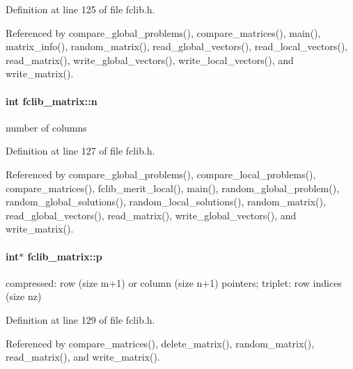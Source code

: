 Definition at line 125 of file fclib.\+h.



Referenced by compare\+\_\+global\+\_\+problems(), compare\+\_\+matrices(), main(), matrix\+\_\+info(), random\+\_\+matrix(), read\+\_\+global\+\_\+vectors(), read\+\_\+local\+\_\+vectors(), read\+\_\+matrix(), write\+\_\+global\+\_\+vectors(), write\+\_\+local\+\_\+vectors(), and write\+\_\+matrix().

\hypertarget{structfclib__matrix_ace0c395ca5da8a4bcc4958a29895c639}{}
\paragraph[{n}]{\setlength{\rightskip}{0pt plus 5cm}int fclib\+\_\+matrix\+::n}\label{structfclib__matrix_ace0c395ca5da8a4bcc4958a29895c639}


number of columns 



Definition at line 127 of file fclib.\+h.



Referenced by compare\+\_\+global\+\_\+problems(), compare\+\_\+local\+\_\+problems(), compare\+\_\+matrices(), fclib\+\_\+merit\+\_\+local(), main(), random\+\_\+global\+\_\+problem(), random\+\_\+global\+\_\+solutions(), random\+\_\+local\+\_\+solutions(), random\+\_\+matrix(), read\+\_\+global\+\_\+vectors(), read\+\_\+matrix(), write\+\_\+global\+\_\+vectors(), and write\+\_\+matrix().

\hypertarget{structfclib__matrix_ace167d937e3c1bb2558e264aefada841}{}
\paragraph[{p}]{\setlength{\rightskip}{0pt plus 5cm}int$\ast$ fclib\+\_\+matrix\+::p}\label{structfclib__matrix_ace167d937e3c1bb2558e264aefada841}


compressed\+: row (size m+1) or column (size n+1) pointers; triplet\+: row indices (size nz) 



Definition at line 129 of file fclib.\+h.



Referenced by compare\+\_\+matrices(), delete\+\_\+matrix(), random\+\_\+matrix(), read\+\_\+matrix(), and write\+\_\+matrix().

